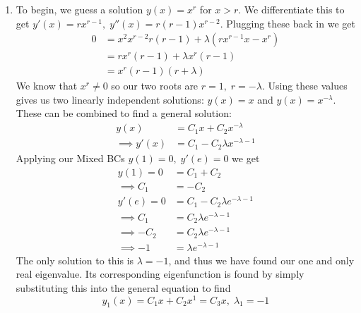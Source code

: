 \documentclass[12pt]{article}
\numberwithin{equation}{section}
\numberwithin{figure}{section}
\begin{document}
\begin{enumerate}
        \item To begin, we guess a solution $y(x)=x^r$ for $x>r$. We differentiate this to get 
        $y'(x)=rx^{r-1},\;y''(x)=r(r-1)x^{r-2}$. Plugging these back in we get 
        \begin{align*}
            0&=x^2x^{r-2}r(r-1)+\lambda(rx^{r-1}x-x^r)\\
            &=rx^r(r-1)+\lambda x^r(r-1)\\
            &=x^r(r-1)(r+\lambda)
        \end{align*}
        We know that $x^r\neq0$ so our two roots are $r=1,\; r=-\lambda$. Using these values gives us two 
        linearly independent solutions: $y(x)=x$ and $y(x)=x^{-\lambda}$. These can be combined to find a 
        general solution:
        \begin{align*}
            y(x)&=C_1x+C_2x^{-\lambda}\\
            \implies y'(x)&=C_1-C_2\lambda x^{-\lambda-1}
        \end{align*}
        Applying our Mixed BCs $y(1)=0,\; y'(e)=0$ we get 
        \begin{align*}
            y(1)=0&=C_1+C_2\\
            \implies C_1&=-C_2\\
            y'(e)=0&=C_1-C_2\lambda e^{-\lambda-1}\\
            \implies C_1&=C_2\lambda e^{-\lambda-1}\\
            \implies -C_2&=C_2\lambda e^{-\lambda-1}\\
            \implies -1&=\lambda e^{-\lambda-1}
        \end{align*}
        The only solution to this is $\lambda=-1$, and thus we have found our one and only real eigenvalue. 
        Its corresponding eigenfunction is found by simply substituting this into the general equation to find 
        \begin{equation*}
            y_1(x)=C_1x+C_2x^1=C_3x,\; \lambda_1=-1
        \end{equation*}
        

\end{enumerate}
\end{document}
